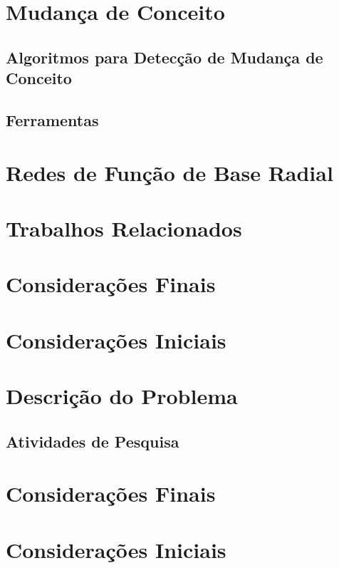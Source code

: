 \documentclass[qual, classic, a4paper]{ufbathesis}
\begin{document}
\section{Mudança de Conceito}
\blindtext

\subsection{Algoritmos para Detecção de Mudança de Conceito}
\blindtext

\subsection{Ferramentas}
\blindtext

\section{Redes de Função de Base Radial}
\blindtext
  
\section{Trabalhos Relacionados}
\blindtext

\section{Considerações Finais}
\blindtext

 \label{plano_pesquisa}
\section{Considerações Iniciais}
\blindtext

\section{Descrição do Problema}
\blindtext

\subsection{Atividades de Pesquisa}
\blindtext

\section{Considerações Finais}
\blindtext

 \label{experimentos_iniciais}
\section{Considerações Iniciais}
\blindtext
\end{document}
